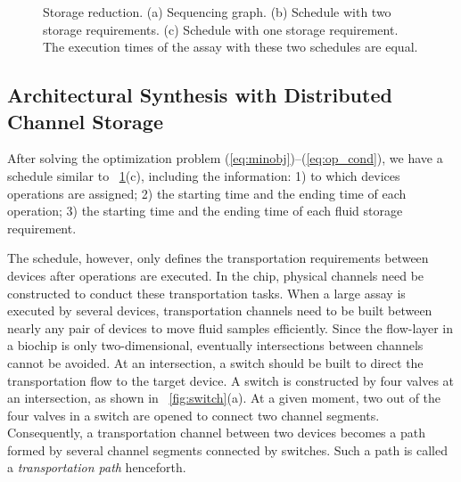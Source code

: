 \begin{figure}[t]
{\figurefontsize
\centering

\caption{Storage reduction. (a) Sequencing graph. (b) Schedule with two
storage requirements. (c) Schedule with one storage requirement. The execution
times of the assay with these two schedules are equal. }
\label{fig:schedule_storage}
}
\end{figure}




\subsection{Architectural Synthesis with Distributed Channel Storage}\label{sec:channel_storage_synthesis}
After solving the
optimization problem (\ref{eq:minobj})--(\ref{eq:op_cond}), we have a schedule
similar to \figname~\ref{fig:schedule_storage}(c),
including the information: 1) to which devices operations are
assigned; 2) the starting time and the ending time of each operation; 3) the
starting time and the ending time of each fluid storage requirement.

The schedule, however, only defines the transportation requirements between
devices after operations are executed. In the chip, physical channels need
be constructed to conduct these transportation tasks.
When a large assay is executed by several devices,
transportation channels need to be built between nearly
any pair of devices to move fluid samples
efficiently.
Since the flow-layer in a biochip is only two-dimensional, eventually
intersections between channels cannot be avoided. At an intersection,
a switch should be built to direct the transportation
flow to the target device. A switch is constructed by
four valves at an intersection, as shown in \figname~\ref{fig:switch}(a). At a
given moment, two out of the four valves in a switch are opened to
connect two channel segments. Consequently, a transportation
channel between two devices becomes a path
formed by several channel segments connected by switches.
Such a path is called a \textit{transportation path} henceforth.

